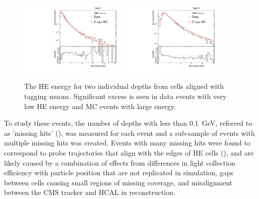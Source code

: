 \begin{figure}[htbp]
	\centering
	\includegraphics[width=0.45\textwidth]{figures/hcalAllE_depth0.pdf}
        \hspace{0.01\textwidth}
        \includegraphics[width=0.45\textwidth]{figures/hcalAllE_depth4.pdf}
        \caption[HE Energy Deposits Along Tag-Aligned Muons]{The HE energy for two individual depths from cells aligned with tagging muons. Significant excess is seen in data events with very low HE energy and MC events with large energy.}
        \label{fig:unCorrHEDepths}
\end{figure}

To study these events, the number of depths with less than \SI{0.1}{\giga\eV}, referred to as 'missing hits' (), was measured for each event and a sub-sample of events with multiple missing hits was created. 
Events with many missing hits were found to correspond to probe trajectories that align with the edges of HE cells (), and are likely caused by a combination of effects from differences in light collection efficiency with particle position that are not replicated in simulation, gaps between cells causing small regions of missing coverage, and misalignment between the CMS tracker and HCAL in reconstruction.

